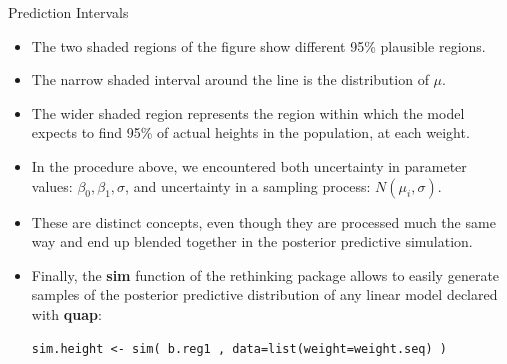 \documentclass[handout]{beamer}
\begin{document}
\begin{frame}[fragile]{Prediction Intervals}
\scriptsize{
\begin{itemize}


\item The two shaded regions of the figure show different 95\% plausible regions. 

\item The narrow shaded interval around the line is the
distribution of $\mu$. 
\item The wider shaded region represents the region within which the model expects to find 95\% of actual heights in the population, at each weight.

\item In the procedure above, we encountered both uncertainty in parameter values: $\beta_0,\beta_1,\sigma$, and uncertainty in a sampling process: $N(\mu_i,\sigma)$. 

\item These are distinct concepts, even though they are processed much the same way and end up blended together in the posterior predictive simulation.

\item Finally, the \textbf{sim} function of the rethinking package allows to easily generate samples of the posterior predictive distribution of any linear model declared with \textbf{quap}:

\begin{verbatim}
sim.height <- sim( b.reg1 , data=list(weight=weight.seq) )
 
\end{verbatim}



\end{itemize}
 

 
}
\end{frame}
\end{document}
